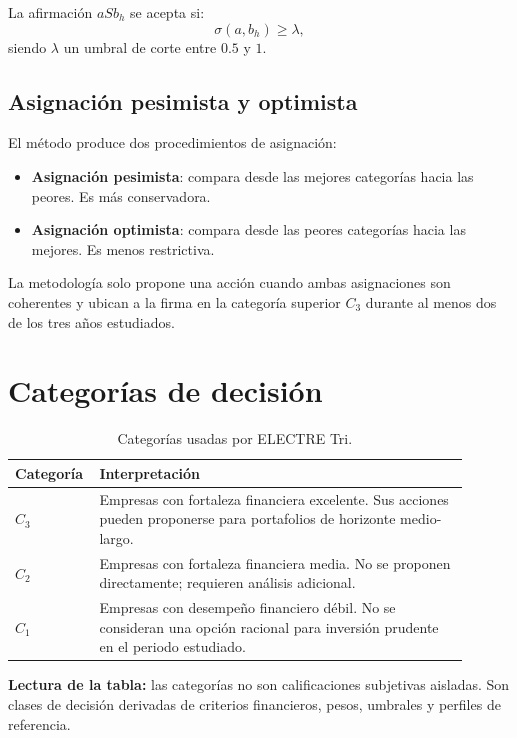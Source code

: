 \documentclass[11pt,a4paper]{article}
\begin{document}
La afirmación $aSb_h$ se acepta si:
\[
\sigma(a,b_h)\geq \lambda,
\]
siendo $\lambda$ un umbral de corte entre $0.5$ y $1$.

\subsection{Asignación pesimista y optimista}

El método produce dos procedimientos de asignación:

\begin{itemize}[leftmargin=*]
    \item \textbf{Asignación pesimista}: compara desde las mejores categorías hacia las peores. Es más conservadora.
    \item \textbf{Asignación optimista}: compara desde las peores categorías hacia las mejores. Es menos restrictiva.
\end{itemize}

La metodología solo propone una acción cuando ambas asignaciones son coherentes y ubican a la firma en la categoría superior $C_3$ durante al menos dos de los tres años estudiados.

\section{Categorías de decisión}

\begin{table}[h!]
\centering
\caption{Categorías usadas por ELECTRE Tri.}
\label{tab:categorias}
\begin{tabular}{p{0.12\linewidth}p{0.78\linewidth}}
\toprule
Categoría & Interpretación \\
\midrule
$C_3$ & Empresas con fortaleza financiera excelente. Sus acciones pueden proponerse para portafolios de horizonte medio-largo. \\
$C_2$ & Empresas con fortaleza financiera media. No se proponen directamente; requieren análisis adicional. \\
$C_1$ & Empresas con desempeño financiero débil. No se consideran una opción racional para inversión prudente en el periodo estudiado. \\
\bottomrule
\end{tabular}
\end{table}

\textbf{Lectura de la tabla:} las categorías no son calificaciones subjetivas aisladas. Son clases de decisión derivadas de criterios financieros, pesos, umbrales y perfiles de referencia.
\end{document}
